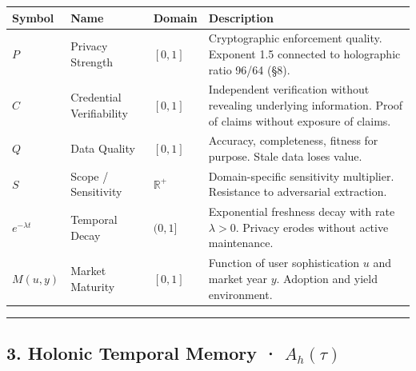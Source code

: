 \documentclass[
]{article}
\newcounter{none} %
\begin{document}
{\def\LTcaptype{none} %
\begin{longtable}[]{@{}
  >{\raggedright\arraybackslash}p{}
  >{\raggedright\arraybackslash}p{}
  >{\raggedright\arraybackslash}p{}
  >{\raggedright\arraybackslash}p{}@{}}
\toprule\noalign{}
\begin{minipage}[b]{\linewidth}\raggedright
Symbol
\end{minipage} & \begin{minipage}[b]{\linewidth}\raggedright
Name
\end{minipage} & \begin{minipage}[b]{\linewidth}\raggedright
Domain
\end{minipage} & \begin{minipage}[b]{\linewidth}\raggedright
Description
\end{minipage} \\
\midrule\noalign{}
\endhead
\bottomrule\noalign{}
\endlastfoot
\(P\) & Privacy Strength & \([0, 1]\) & Cryptographic enforcement
quality. Exponent 1.5 connected to holographic ratio 96/64 (§8). \\
\(C\) & Credential Verifiability & \([0, 1]\) & Independent verification
without revealing underlying information. Proof of claims without
exposure of claims. \\
\(Q\) & Data Quality & \([0, 1]\) & Accuracy, completeness, fitness for
purpose. Stale data loses value. \\
\(S\) & Scope / Sensitivity & \(\mathbb{R}^+\) & Domain-specific
sensitivity multiplier. Resistance to adversarial extraction. \\
\(e^{-\lambda t}\) & Temporal Decay & \((0, 1]\) & Exponential freshness
decay with rate \(\lambda > 0\). Privacy erodes without active
maintenance. \\
\(M(u, y)\) & Market Maturity & \([0, 1]\) & Function of user
sophistication \(u\) and market year \(y\). Adoption and yield
environment. \\
\end{longtable}
}

\begin{center}\rule{0.5\linewidth}{0.5pt}\end{center}

\subsection{\texorpdfstring{3. Holonic Temporal Memory ·
\(A_h(\tau)\)}{3. Holonic Temporal Memory · A\_h(\textbackslash tau)}}\label{holonic-temporal-memory-a_htau}
\end{document}
